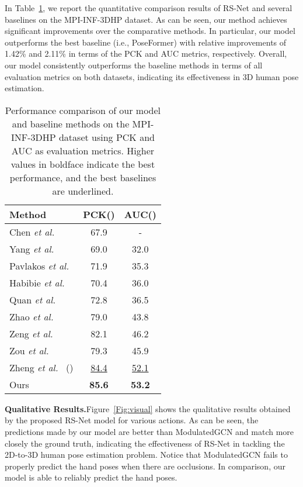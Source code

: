 \documentclass[10pt,journal]{IEEEtran}
\begin{document}
In Table~\ref{Tab:MPI}, we report the quantitative comparison results of RS-Net and several baselines on the MPI-INF-3DHP dataset. As can be seen, our method achieves significant improvements over the comparative methods. In particular, our model outperforms the best baseline (i.e., PoseFormer) with relative improvements of 1.42\% and 2.11\% in terms of the PCK and AUC metrics, respectively. Overall, our model consistently outperforms the baseline methods in terms of all evaluation metrics on both datasets, indicating its effectiveness in 3D human pose estimation.

\begin{table}[!htb]
\caption{Performance comparison of our model and baseline methods on the MPI-INF-3DHP dataset using PCK and AUC as evaluation metrics. Higher values in boldface indicate the best performance, and the best baselines are underlined.}
\small
\setlength{\tabcolsep}{2.5pt}
\medskip
\centering
\begin{tabular}{lcc}
\toprule
Method & PCK() & AUC()\\
\midrule
Chen  \textit{et al.}~\cite{li2019generating} & 67.9 & - \\
Yang \textit{et al.}~\cite{yang20183d} & 69.0 & 32.0 \\
Pavlakos \textit{et al.}~\cite{pavlakos2018ordinal}  & 71.9 & 35.3 \\
Habibie \textit{et al.}~\cite{Habibie:19}  & 70.4 & 36.0 \\
Quan \textit{et al.}~\cite{quan2021higher} & 72.8 &36.5 \\
Zhao \textit{et al.}~\cite{Weixi2021GraFormer} & 79.0 & 43.8\\
Zeng \textit{et al.}~\cite{Ailing2021Hard} & 82.1 & 46.2 \\
Zou \textit{et al.}~\cite{zou2021compositional} & 79.3 & 45.9\\
Zheng \textit{et al.}~\cite{PoseFormer:2021} () & \underline{84.4} & \underline{52.1} \\
\midrule
Ours & \textbf{85.6} &\textbf{53.2} \\
\bottomrule
\end{tabular}
\label{Tab:MPI}
\end{table}
	
\medskip\noindent\textbf{Qualitative Results.}\quad Figure~\ref{Fig:visual} shows the qualitative results obtained by the proposed RS-Net model for various actions. As can be seen, the predictions made by our model are better than ModulatedGCN and match more closely the ground truth, indicating the effectiveness of RS-Net in tackling the 2D-to-3D human pose estimation problem. Notice that ModulatedGCN fails to properly predict the hand poses when there are occlusions. In comparison, our model is able to reliably predict the hand poses.
	
\end{document}
